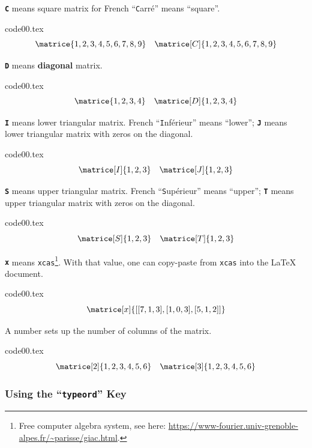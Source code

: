 \documentclass[full]{l3doc}
\newcommand{\ObjetPres}[2]{\textcolor{#1}{\textbf{\texttt{#2}}}}
\newcommand{\keyname}{\ObjetPres{keycolor}}
\newcommand{\TypeMat}{\ObjetPres{keyword30}}
\newcommand{\UnExemple}{%
  \par \medskip \par \noindent
  \begin{minipage}[c]{0.66\linewidth}
    
  \end{minipage}
  \hspace{\stretch{1}}
  \begin{minipage}[c]{0.32\linewidth}
    \small
    
  \end{minipage}
  \par \medbreak}
\begin{document}
\medskip{}

 \TypeMat{C} means square matrix for French ``\texttt{C}arré'' means ``square''.
\begin{VerbatimOut}[gobble=0]{code00.tex}
\[
 \matrice{1, 2, 3, 4, 5, 6, 7, 8, 9}
 \quad
 \matrice[C]{1, 2, 3, 4, 5, 6, 7, 8, 9}
\]
\end{VerbatimOut}
\UnExemple{}

 \TypeMat{D} means \textbf{diagonal} matrix.
\begin{VerbatimOut}[gobble=0]{code00.tex}
\[
 \matrice{1, 2, 3, 4}\quad
 \matrice[D]{1, 2, 3, 4}
\]
\end{VerbatimOut}
\UnExemple{}

\TypeMat{I} means lower triangular matrix. French ``\texttt{I}nférieur'' means
``lower''; \TypeMat{J} means lower triangular matrix with zeros on the diagonal.
\begin{VerbatimOut}[gobble=0]{code00.tex}
\[
 \matrice[I]{1, 2, 3}\quad
 \matrice[J]{1, 2, 3}
\]
\end{VerbatimOut}
\UnExemple{}

\TypeMat{S} means upper triangular matrix. French ``\texttt{S}upérieur'' means
``upper''; \TypeMat{T} means upper triangular matrix with zeros on the diagonal.
\begin{VerbatimOut}[gobble=0]{code00.tex}
\[
 \matrice[S]{1, 2, 3}\quad
 \matrice[T]{1, 2, 3}
\]
\end{VerbatimOut}
\UnExemple{}

\TypeMat{x} means \texttt{xcas}\footnote{Free computer algebra system, see here:
\url{https://www-fourier.univ-grenoble-alpes.fr/~parisse/giac.html}.}. With that value, one can copy-paste from
\texttt{xcas} into the \LaTeX{} document.
\begin{VerbatimOut}[gobble=0]{code00.tex}
\[
 \matrice[x]{[[7,1,3],[1,0,3],[5,1,2]]}
\]
\end{VerbatimOut}
\UnExemple{}

\pagebreak[3]
A number sets up the number of columns of the matrix.
\begin{VerbatimOut}[gobble=0]{code00.tex}
\[
 \matrice[2]{1, 2, 3, 4, 5, 6}
 \quad
 \matrice[3]{1, 2, 3, 4, 5, 6}
\]
\end{VerbatimOut}
\UnExemple{}

\subsubsection{Using the ``\keyname{typeord}'' Key}
\label{sec:matrix-type-key}
\end{document}
